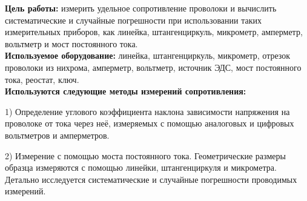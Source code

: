 
\textbf{Цель работы:} измерить удельное сопротивление проволоки и вычислить систематические и случайные погрешности при использовании таких измерительных приборов, как линейка, штангенциркуль, микрометр, амперметр, вольтметр и мост постоянного тока.\\

\textbf{Используемое оборудование:} линейка, штангенциркуль, микрометр, отрезок проволоки из нихрома, амперметр, вольтметр, источник ЭДС, мост постоянного тока, реостат, ключ.\\

\textbf{Используются следующие методы измерений сопротивления:}

1) Определение углового коэффициента наклона зависимости напряжения на проволоке от тока через неё, измеряемых с помощью аналоговых и цифровых вольтметров и амперметров.

2) Измерение с помощью моста постоянного тока. Геометрические размеры образца измеряются с помощью линейки, штангенциркуля и микрометра. Детально исследуется систематические и случайные погрешности проводимых измерений.

